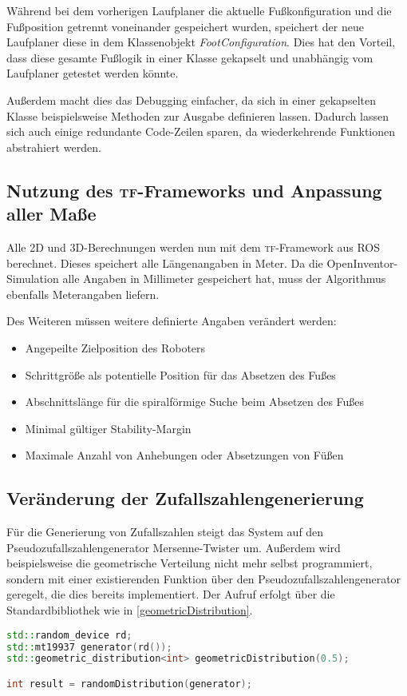 Während bei dem vorherigen Laufplaner die aktuelle Fußkonfiguration und die Fußposition getrennt voneinander gespeichert wurden, speichert der neue Laufplaner diese in dem Klassenobjekt \emph{FootConfiguration}. Dies hat den Vorteil, dass diese gesamte Fußlogik in einer Klasse gekapselt und unabhängig vom Laufplaner getestet werden könnte.

Außerdem macht dies das Debugging einfacher, da sich in einer gekapselten Klasse beispielsweise Methoden zur Ausgabe definieren lassen. Dadurch lassen sich auch einige redundante Code-Zeilen sparen, da wiederkehrende Funktionen abstrahiert werden.

\subsection{Nutzung des \textsc{tf}-Frameworks und Anpassung aller Maße}

Alle 2D und 3D-Berechnungen werden nun mit dem \textsc{tf}-Framework aus \ac{ROS} berechnet. Dieses speichert alle Längenangaben in Meter. Da die OpenInventor-Simulation alle Angaben in Millimeter gespeichert hat, muss der Algorithmus ebenfalls Meterangaben liefern.

Des Weiteren müssen weitere definierte Angaben verändert werden:
\begin{itemize}
  \item Angepeilte Zielposition des Roboters
  \item Schrittgröße als potentielle Position für das Absetzen des Fußes 
  \item Abschnittslänge für die spiralförmige Suche beim Absetzen des Fußes
  \item Minimal gültiger Stability-Margin
  \item Maximale Anzahl von Anhebungen oder Absetzungen von Füßen
\end{itemize}

\subsection{Veränderung der Zufallszahlengenerierung}

Für die Generierung von Zufallszahlen steigt das System auf den Pseudozufallszahlengenerator Mersenne-Twister \autocite{matsumoto1998mersenne} um. Außerdem wird beispielsweise die geometrische Verteilung nicht mehr selbst programmiert, sondern mit einer existierenden Funktion über den Pseudozufallszahlengenerator geregelt, die dies bereits implementiert. Der Aufruf erfolgt über die Standardbibliothek wie in \autoref{geometricDistribution}.

\begin{lstlisting}[label={geometricDistribution}, language=C++, caption={Geometrische Verteilung mittels C++}]
std::random_device rd;
std::mt19937 generator(rd());
std::geometric_distribution<int> geometricDistribution(0.5);

int result = randomDistribution(generator);
\end{lstlisting}
